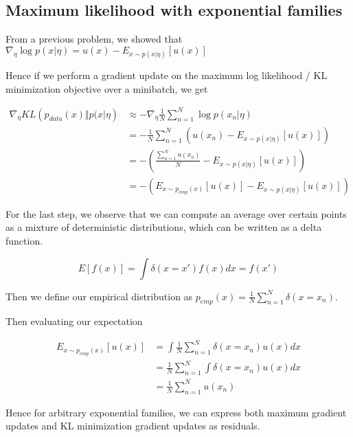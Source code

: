 \documentclass[a4paper]{article}
\begin{document}
\subsection{Maximum likelihood with exponential families}

From a previous problem, we showed that $\nabla_\eta \log p(x \vert \eta) = u(x) - E_{ x \sim p( x \vert \eta) } \left[ u(x) \right]$

Hence if we perform a gradient update on the maximum log likelihood / KL minimization objective over a minibatch, we get

\begin{equation}
  \begin{split}
    \nabla_\eta KL\left( p_{data}(x) \Vert p( x \vert \eta \right) &\approx - \nabla_\eta \frac{1}{N} \sum_{n=1}^N \log p(x_n \vert \eta) \\
    &= - \frac{1}{N} \sum_{n=1}^N \left( u(x_n) - E_{ x \sim p(x \vert \eta)} \left[ u(x) \right] \right) \\
    &= - \left( \frac{\sum_{n=1}^N u(x_n)}{N} - E_{ x \sim p(x \vert \eta)} \left[ u(x) \right] \right) \\
    &= - \left( E_{ x \sim p_{emp}(x)} \left[ u(x) \right] - E_{ x \sim p( x \vert \eta)} \left[ u(x) \right] \right)
  \end{split}
  \label{}
\end{equation}

For the last step, we observe that we can compute an average over certain points as a mixture of deterministic distributions, which can be written as a delta function.

\begin{equation}
  E \left[ f(x) \right] = \int \delta( x = x' ) f(x) dx = f(x')
  \label{}
\end{equation}

Then we define our empirical distribution as $p_{emp}(x) = \frac{1}{N} \sum_{n=1}^N \delta( x = x_n) $. 

Then evaluating our expectation

\begin{equation}
  \begin{split}
    E_{ x \sim p_{emp}(x) } \left[ u(x) \right] &= \int \frac{1}{N} \sum_{n=1}^N \delta( x = x_n) u(x) dx \\
    &= \frac{1}{N} \sum_{n=1}^N \int \delta(x = x_n) u(x) dx \\
    &= \frac{1}{N} \sum_{n=1}^N u(x_n)
  \end{split}
  \label{}
\end{equation}

Hence for arbitrary exponential families, we can express both maximum gradient updates and KL minimization gradient updates as residuals.
\end{document}
